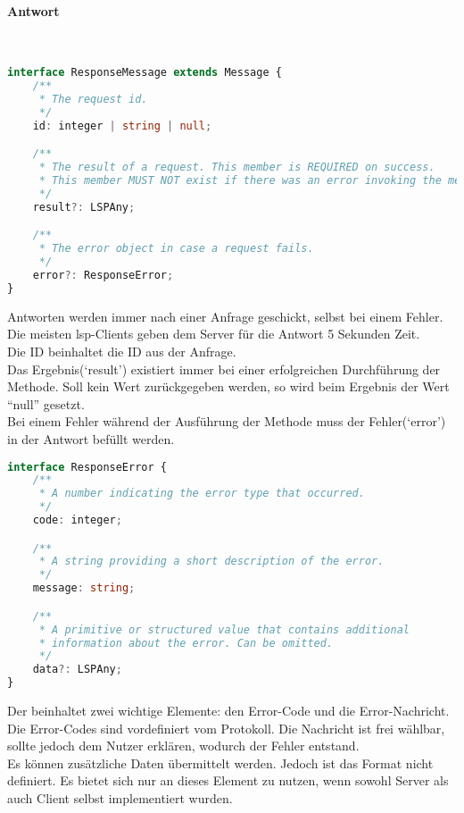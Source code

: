 \documentclass[./einleitung.tex]{subfiles}
\begin{document}
    \paragraph{Antwort}\\
    \begin{lstlisting}[language=Typescript]
interface ResponseMessage extends Message {
	/**
	 * The request id.
	 */
	id: integer | string | null;

	/**
	 * The result of a request. This member is REQUIRED on success.
	 * This member MUST NOT exist if there was an error invoking the method.
	 */
	result?: LSPAny;

	/**
	 * The error object in case a request fails.
	 */
	error?: ResponseError;
}
    \end{lstlisting}
    Antworten werden immer nach einer Anfrage geschickt, selbst bei einem Fehler.\\
    Die meisten \acrshort{lsp}-Clients geben dem Server für die Antwort 5 Sekunden Zeit.\\
    Die ID beinhaltet die ID aus der Anfrage.\\
    Das Ergebnis(`result') existiert immer bei einer erfolgreichen Durchführung der Methode.
    Soll kein Wert zurückgegeben werden, so wird beim Ergebnis der Wert ``null'' gesetzt.\\
    Bei einem Fehler während der Ausführung der Methode muss der Fehler(`error') in der Antwort befüllt werden.
    \begin{lstlisting}[language=Typescript]
interface ResponseError {
	/**
	 * A number indicating the error type that occurred.
	 */
	code: integer;

	/**
	 * A string providing a short description of the error.
	 */
	message: string;

	/**
	 * A primitive or structured value that contains additional
	 * information about the error. Can be omitted.
	 */
	data?: LSPAny;
}
    \end{lstlisting}
    Der beinhaltet zwei wichtige Elemente: den Error-Code und die Error-Nachricht.
    Die Error-Codes sind vordefiniert vom Protokoll.\cite{response}
    Die Nachricht ist frei wählbar, sollte jedoch dem Nutzer erklären, wodurch der Fehler entstand.\\
    Es können zusätzliche Daten übermittelt werden.
    Jedoch ist das Format nicht definiert.
    Es bietet sich nur an dieses Element zu nutzen, wenn sowohl Server als auch Client selbst implementiert wurden.
\end{document}
